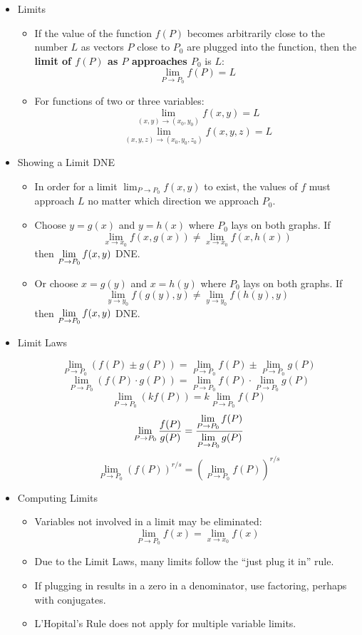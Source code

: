 \begin{itemize}

  \item Limits
    \begin{itemize}
      \item If the value of the function $f(P)$ becomes arbitrarily close to the number $L$ as vectors $P$ close to $P_0$ are plugged into the function, then the \textbf{limit of $f(P)$ as $P$ approaches $P_0$} is $L$: \[\lim_{P\to P_0} f(P) = L\]
      \item For functions of two or three variables:
      \[\lim_{(x,y)\to(x_0,y_0)}f(x,y) = L\]
      \[\lim_{(x,y,z)\to(x_0,y_0,z_0)}f(x,y,z) = L\]
    \end{itemize}
  
  \item Showing a Limit DNE
  
    \begin{itemize}
      \item In order for a limit $\lim_{P\to P_0}f(x,y)$ to exist, the values of $f$ must approach $L$ no matter which direction we approach $P_0$.
      \item Choose $y=g(x)$ and $y=h(x)$ where $P_0$ lays on both graphs. If
        \[
          \lim_{x\to x_0} f(x,g(x)) \not= \lim_{x\to x_0} f(x,h(x))
        \]
        then $\displaystyle\lim_{P\to P_0} f(x,y)$ DNE.
      \item Or choose $x=g(y)$ and $x=h(y)$ where $P_0$ lays on both graphs. If 
        \[
          \lim_{y\to y_0} f(g(y),y) \not= \lim_{y\to y_0} f(h(y),y)
        \]
        then $\displaystyle\lim_{P\to P_0} f(x,y)$ DNE.
    \end{itemize}
    
  \item Limit Laws
  
    \[\lim_{P\to P_0}(f(P)\pm g(P)) = \lim_{P\to P_0}f(P) \pm \lim_{P\to P_0}g(P)\]
    \[\lim_{P\to P_0}(f(P)\cdot g(P)) = \lim_{P\to P_0}f(P) \cdot \lim_{P\to P_0}g(P)\]
    \[\lim_{P\to P_0}(kf(P)) = k\lim_{P\to P_0}f(P)\]
    \[\lim_{P\to P_0}\frac{f(P)}{g(P)} = \frac{\displaystyle \lim_{P\to P_0}f(P)}{\displaystyle \lim_{P\to P_0}g(P)}\]
    \[\lim_{P\to P_0}(f(P))^{r/s} = \left(\lim_{P\to P_0}f(P)\right)^{r/s}\]
          
  \item Computing Limits
    
      \begin{itemize}
      \item Variables not involved in a limit may be eliminated: \[\lim_{P \to P_0} f(x) = \lim_{x\to x_0} f(x)\]
      \item Due to the Limit Laws, many limits follow the ``just plug it in'' rule.
      \item If plugging in results in a zero in a denominator, use factoring, perhaps with conjugates.
      \item L'Hopital's Rule does not apply for multiple variable limits.
      \end{itemize}
  

\end{itemize}
